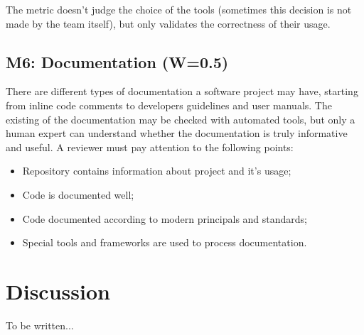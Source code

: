 \documentclass[12pt,oneside]{article}
\begin{document}
The metric doesn't judge the choice of the tools (sometimes this decision
is not made by the team itself), but only validates the correctness
of their usage.

\subsection{M6: Documentation (W=0.5)}

There are different types of documentation a software project may have,
starting from inline code comments to developers guidelines and user manuals.
The existing of the documentation may be checked with automated tools,
but only a human expert can understand whether the documentation is truly
informative and useful. A reviewer must pay attention to the following points:

\begin{itemize}
  \item Repository contains information about project and it's usage;
  \item Code is documented well;
  \item Code documented according to modern principals and standards;
  \item Special tools and frameworks are used to process documentation.
\end{itemize}

\section{Discussion}
\label{sec:discussion}

To be written...



\end{document}
